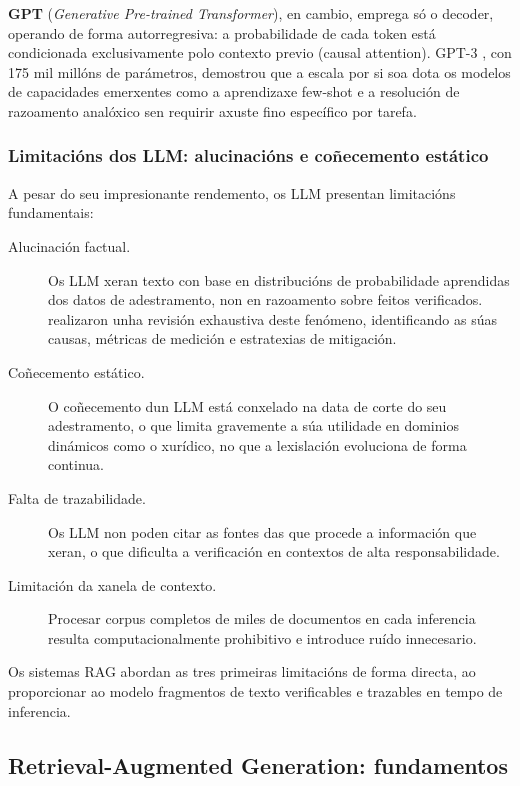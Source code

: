 \documentclass[11pt, a4paper, oneside]{report}
\begin{document}
\textbf{GPT} (\textit{Generative Pre-trained Transformer}), en cambio, emprega só o
decoder, operando de forma autorregresiva: a probabilidade de cada token está
condicionada exclusivamente polo contexto previo (causal attention). GPT-3 \citep{brown2020language},
con 175 mil millóns de parámetros, demostrou que a escala por si soa dota os modelos
de capacidades emerxentes como a aprendizaxe few-shot e a resolución de razoamento
analóxico sen requirir axuste fino específico por tarefa.

\subsubsection{Limitacións dos LLM: alucinacións e coñecemento estático}
\label{sec:limitacions}

A pesar do seu impresionante rendemento, os LLM presentan limitacións fundamentais:

\begin{description}
  \item[Alucinación factual.] Os LLM xeran texto con base en distribucións de
    probabilidade aprendidas dos datos de adestramento, non en razoamento sobre
    feitos verificados. \citet{ji2023survey} realizaron unha revisión exhaustiva deste
    fenómeno, identificando as súas causas, métricas de medición e estratexias de
    mitigación.

  \item[Coñecemento estático.] O coñecemento dun LLM está conxelado na data de corte
    do seu adestramento, o que limita gravemente a súa utilidade en dominios dinámicos
    como o xurídico, no que a lexislación evoluciona de forma continua.

  \item[Falta de trazabilidade.] Os LLM non poden citar as fontes das que procede a
    información que xeran, o que dificulta a verificación en contextos de alta
    responsabilidade.

  \item[Limitación da xanela de contexto.] Procesar corpus completos de miles de
    documentos en cada inferencia resulta computacionalmente prohibitivo e introduce
    ruído innecesario.
\end{description}

Os sistemas RAG abordan as tres primeiras limitacións de forma directa, ao proporcionar
ao modelo fragmentos de texto verificables e trazables en tempo de inferencia.

\subsection{Retrieval-Augmented Generation: fundamentos}
\label{sec:rag_fundamentos}
\end{document}
